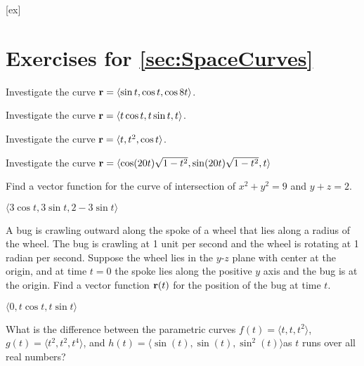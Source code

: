 [ex]
\section*{Exercises for \ref{sec:SpaceCurves}}

\begin{enumialphparenastyle}

\begin{ex}
Investigate the curve ${\bf r}=\langle \sin t,\cos t,\cos
8t\rangle$.
\end{ex}

\begin{ex}
Investigate the curve 
${\bf r}=\langle t\cos t,t\sin t,t\rangle$.
\end{ex}

\begin{ex}
Investigate the curve 
${\bf r}=\langle t,t^2,\cos t\rangle$.
\end{ex}

\begin{ex}
Investigate the curve 
${\bf r}=\langle \cos(20t)\sqrt{1-t^2},\sin(20t)\sqrt{1-t^2},t\rangle$
\end{ex}

\begin{ex}
Find a vector function for the curve of intersection of
$x^2+y^2=9$ and $y+z=2$.
\begin{sol}
	$\langle 3\cos t, 3\sin t, 2-3\sin t\rangle$
\end{sol}
\end{ex}

\begin{ex}
A bug is crawling outward along the spoke of a wheel that lies along
a radius of the wheel. The bug is crawling at 1 unit per second and
the wheel is rotating at 1 radian per second. Suppose the wheel lies
in the $y$-$z$ plane with center at the origin, and at time $t=0$ the
spoke lies along the positive $y$ axis and the bug is at the origin.
Find a vector function ${\bf r}(t)$
for the position of the bug at time $t$.
\begin{sol}
	$\langle 0,t\cos t,t\sin t\rangle$
\end{sol}
\end{ex}

\begin{ex}
What is the difference between the parametric curves
$f(t)=\langle t, t, t^2 \rangle$, $g(t)=\langle t^2, t^2, t^4
\rangle$, and $h(t)=\langle \sin(t), \sin(t), \sin^2(t) \rangle$as $t$
runs over all real numbers?
\end{ex}


\end{enumialphparenastyle}
